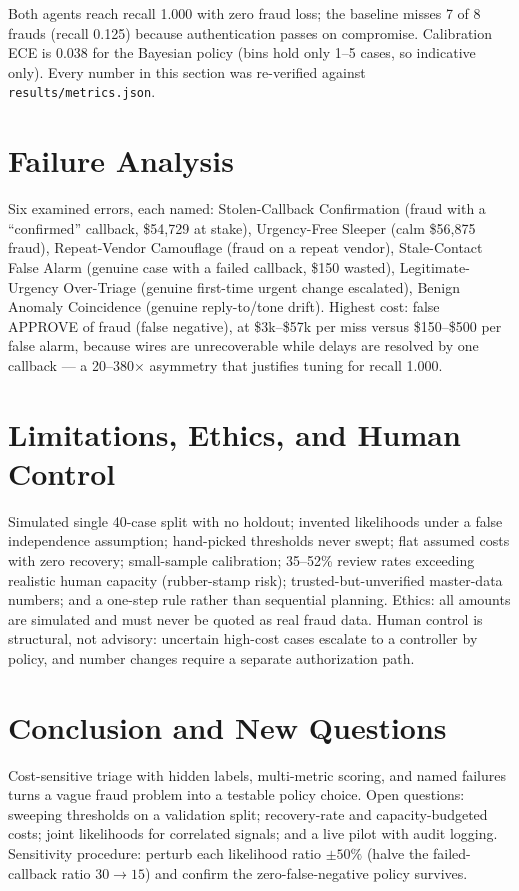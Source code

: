 \documentclass{article}
\begin{document}
Both agents reach recall 1.000 with zero fraud loss; the baseline misses 7 of 8
frauds (recall 0.125) because authentication passes on compromise. Calibration ECE is
0.038 for the Bayesian policy (bins hold only 1--5 cases, so indicative only).
Every number in this section was re-verified against \texttt{results/\allowbreak{}metrics.json}.

\section{Failure Analysis}
Six examined errors, each named: Stolen-Callback Confirmation (fraud with a
``confirmed'' callback, \$54,729 at stake), Urgency-Free Sleeper (calm \$56,875
fraud), Repeat-Vendor Camouflage (fraud on a repeat vendor), Stale-Contact False
Alarm (genuine case with a failed callback, \$150 wasted), Legitimate-Urgency
Over-Triage (genuine first-time urgent change escalated), Benign Anomaly Coincidence
(genuine reply-to/tone drift). Highest cost: false APPROVE of fraud (false
negative), at \$3k--\$57k per miss versus \$150--\$500 per false alarm, because wires
are unrecoverable while delays are resolved by one callback --- a 20--380$\times$
asymmetry that justifies tuning for recall 1.000.

\section{Limitations, Ethics, and Human Control}
Simulated single 40-case split with no holdout; invented likelihoods under a false
independence assumption; hand-picked thresholds never swept; flat assumed costs with
zero recovery; small-sample calibration; 35--52\% review rates exceeding realistic
human capacity (rubber-stamp risk); trusted-but-unverified master-data numbers; and a
one-step rule rather than sequential planning. Ethics: all amounts are simulated and
must never be quoted as real fraud data. Human control is structural, not advisory:
uncertain high-cost cases escalate to a controller by policy, and number changes
require a separate authorization path.

\section{Conclusion and New Questions}
Cost-sensitive triage with hidden labels, multi-metric scoring, and named failures
turns a vague fraud problem into a testable policy choice. Open questions: sweeping
thresholds on a validation split; recovery-rate and capacity-budgeted costs; joint
likelihoods for correlated signals; and a live pilot with audit logging. Sensitivity
procedure: perturb each likelihood ratio $\pm50\%$ (halve the failed-callback ratio
$30\to15$) and confirm the zero-false-negative policy survives.
\end{document}
